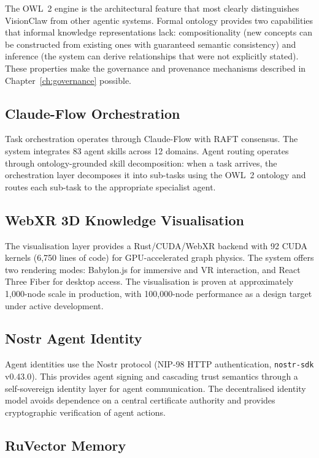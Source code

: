 The OWL~2 engine is the architectural feature that most clearly distinguishes VisionClaw from other agentic systems. Formal ontology provides two capabilities that informal knowledge representations lack: compositionality (new concepts can be constructed from existing ones with guaranteed semantic consistency) and inference (the system can derive relationships that were not explicitly stated). These properties make the governance and provenance mechanisms described in Chapter~\ref{ch:governance} possible.

\subsection{Claude-Flow Orchestration}

Task orchestration operates through Claude-Flow with RAFT consensus. The system integrates 83 agent skills across 12 domains. Agent routing operates through ontology-grounded skill decomposition: when a task arrives, the orchestration layer decomposes it into sub-tasks using the OWL~2 ontology and routes each sub-task to the appropriate specialist agent.

\subsection{WebXR 3D Knowledge Visualisation}

The visualisation layer provides a Rust/CUDA/WebXR backend with 92 CUDA kernels (6,750 lines of code) for GPU-accelerated graph physics. The system offers two rendering modes: Babylon.js for immersive and VR interaction, and React Three Fiber for desktop access. The visualisation is proven at approximately 1,000-node scale in production, with 100,000-node performance as a design target under active development.

\subsection{Nostr Agent Identity}

Agent identities use the Nostr protocol (NIP-98 HTTP authentication, \texttt{nostr-sdk} v0.43.0). This provides agent signing and cascading trust semantics through a self-sovereign identity layer for agent communication. The decentralised identity model avoids dependence on a central certificate authority and provides cryptographic verification of agent actions.

\subsection{RuVector Memory}

